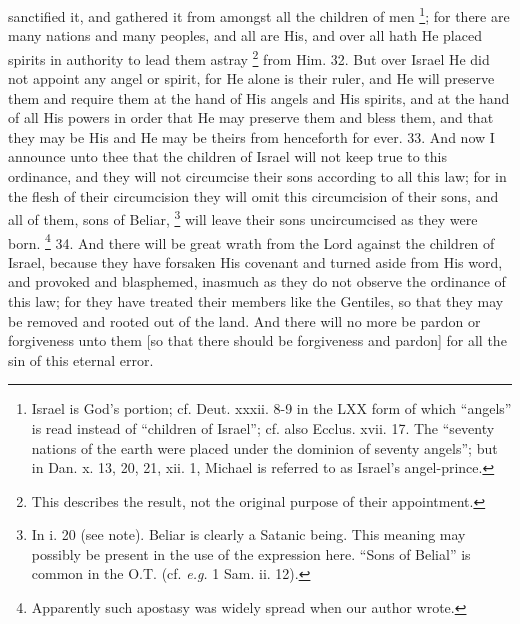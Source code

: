 sanctified it, and gathered it from amongst all the children of men \footnote{Israel is God's portion; cf. Deut. xxxii. 8-9 in the LXX form of which ``angels'' is read instead of ``children of Israel''; cf. also Ecclus. xvii. 17. The ``seventy nations of the earth were placed under the dominion of seventy angels''; but in Dan. x. 13, 20, 21, xii. 1, Michael is referred to as Israel's angel-prince.}; for there are many nations and many peoples, and all are His, and over all hath He placed spirits in authority to lead them astray \footnote{This describes the result, not the original purpose of their appointment.} from Him. 32. But over Israel He did not appoint any angel or spirit, for He alone is their ruler, and He will preserve them and require them at the hand of His angels and His spirits, and at the hand of all His powers in order that He may preserve them and bless them, and that they may be His and He may be theirs from henceforth for ever. 33. And now I announce unto thee that the children of Israel will not keep true to this ordinance, and they will not circumcise their sons according to all this law; for in the flesh of their circumcision they will omit this circumcision of their sons, and all of them, sons of Beliar, \footnote{In i. 20 (see note). Beliar is clearly a Satanic being. This meaning may possibly be present in the use of the expression here. ``Sons of Belial'' is common in the O.T. (cf. \emph{e.g.} 1 Sam. ii. 12).} will leave their sons uncircumcised as they were born. \footnote{Apparently such apostasy was widely spread when our author wrote.} 34. And there will be great wrath from the Lord against the children of Israel, because they have forsaken His covenant and turned aside from His word, and provoked and blasphemed, inasmuch as they do not observe the ordinance of this law; for they have treated their members like the Gentiles, so that they may be removed and rooted out of the land. And there will no more be pardon or forgiveness unto them [so that there should be forgiveness and pardon] for all the sin of this eternal error.


